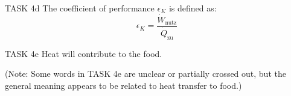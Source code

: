 TASK 4d  
The coefficient of performance \( \epsilon_K \) is defined as:  
\[
\epsilon_K = \frac{\dot{W}_{\text{nutz}}}{\dot{Q}_{\text{zu}}}
\]

TASK 4e  
Heat will contribute to the food.  

(Note: Some words in TASK 4e are unclear or partially crossed out, but the general meaning appears to be related to heat transfer to food.)